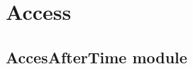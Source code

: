 \documentclass[letterpaper,10pt,english]{sphinxmanual}
\begin{document}
\section{Access}
\label{\detokenize{doc/Access/modules:access}}\label{\detokenize{doc/Access/modules::doc}}

\subsection{AccesAfterTime module}
\label{\detokenize{doc/Access/AccesAfterTime:module-AccesAfterTime}}\label{\detokenize{doc/Access/AccesAfterTime:accesaftertime-module}}\label{\detokenize{doc/Access/AccesAfterTime::doc}}
\end{document}

